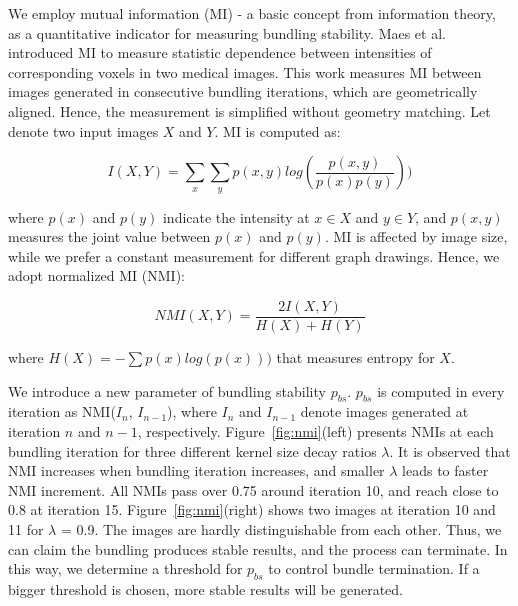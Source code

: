 
We employ mutual information (MI) - a basic concept from information theory, as a quantitative indicator for measuring bundling stability.
Maes et al.~\cite{maes1997multimodality} introduced MI to measure statistic dependence between intensities of corresponding voxels in two medical images.
This work measures MI between images generated in consecutive bundling iterations, which are geometrically aligned.
Hence, the measurement is simplified without geometry matching. 
Let denote two input images $X$ and $Y$.
MI is computed as:

\vspace{-6mm} 
\begin{equation} \label{eq:mi}
I(X, Y) = \sum_{x}\sum_{y}p(x,y)log(\frac{p(x,y)}{p(x)p(y)}))
\end{equation}

\noindent
where $p(x)$ and $p(y)$ indicate the intensity at $x \in X$ and $y \in Y$, and $p(x, y)$ measures the joint value between $p(x)$ and $p(y)$.
MI is affected by image size, while we prefer a constant measurement for different graph drawings.
Hence, we adopt normalized MI (NMI):

\vspace{-6mm} 
\begin{equation}\label{eq:nmi}
NMI(X, Y) = \frac{2I(X,Y)}{H(X) + H(Y)} 
\end{equation}

\noindent
where $H(X) = -\sum p(x)log(p(x)))$ that measures entropy for $X$.

We introduce a new parameter of bundling stability $p_{bs}$.
$p_{bs}$ is computed in every iteration as NMI($I_n$, $I_{n-1}$), where $I_n$ and $I_{n-1}$ denote images generated at iteration $n$ and $n-1$, respectively.
Figure~\ref{fig:nmi}(left) presents NMIs at each bundling iteration for three different kernel size decay ratios $\lambda$.
It is observed that NMI increases when bundling iteration increases, and smaller $\lambda$ leads to faster NMI increment.
All NMIs pass over 0.75 around iteration 10, and reach close to 0.8 at iteration 15.
Figure~\ref{fig:nmi}(right) shows two images at iteration 10 and 11 for $\lambda$ = 0.9.
The images are hardly distinguishable from each other.
Thus, we can claim the bundling produces stable results, and the process can terminate.
In this way, we determine a threshold for $p_{bs}$ to control bundle termination.
If a bigger threshold is chosen, more stable results will be generated.

